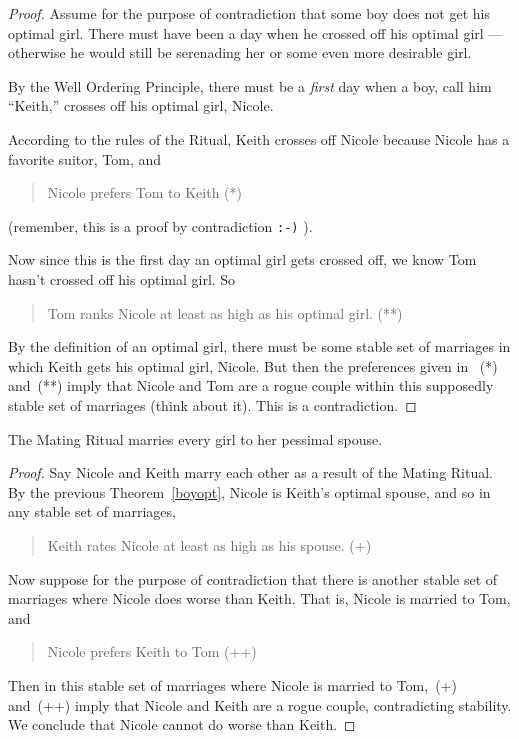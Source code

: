 \begin{proof}
Assume for the purpose of contradiction that some boy does not get his
optimal girl.  There must have been a day when he crossed off his optimal
girl ---otherwise he would still be serenading her or some even more
desirable girl.

By the Well Ordering Principle, there must be a \emph{first} day when a
boy, call him ``Keith,'' crosses off his optimal girl, Nicole.

According to the rules of the Ritual, Keith crosses off Nicole because
Nicole has a favorite suitor, Tom, and
\begin{quote}
Nicole prefers Tom to Keith (*)
\end{quote}
(remember, this is a proof by contradiction \texttt{:-)} ).

Now since this is the first day an optimal girl gets crossed off, we know
Tom hasn't crossed off his optimal girl.  So
\begin{quote}
Tom ranks Nicole at least as high as his optimal girl. (**)
\end{quote}
By the definition of an optimal girl, there must be some stable set of
marriages in which Keith gets his optimal girl, Nicole.  But then the
preferences given in ~(*) and~(**) imply that Nicole and Tom are a
rogue couple within this supposedly stable set of marriages (think
about it).  This is a contradiction.
\end{proof}

\begin{theorem}
The Mating Ritual marries every girl to her pessimal spouse.
\end{theorem}

\begin{proof}
Say Nicole and Keith marry each other as a result of the Mating Ritual.
By the previous Theorem~\ref{boyopt}, Nicole is Keith's optimal spouse,
and so in any stable set of marriages,
\begin{quote}
Keith rates Nicole at least as high as his spouse. (+)
\end{quote}

Now suppose for the purpose of contradiction that there is another stable
set of marriages where Nicole does worse than Keith.  That is, Nicole is
married to Tom, and
\begin{quote}
Nicole prefers Keith to Tom (++)
\end{quote}
Then in this stable set of marriages where Nicole is married to Tom,~(+)
and~(++) imply that Nicole and Keith are a rogue couple, contradicting
stability.  We conclude that Nicole cannot do worse than Keith.
\end{proof}

